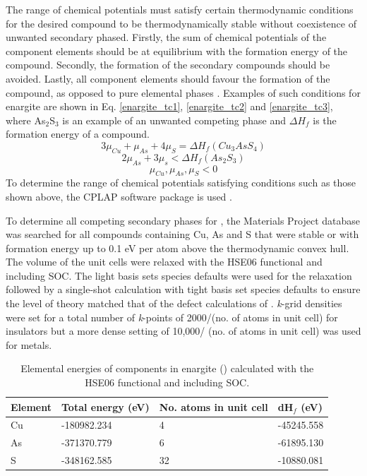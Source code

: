 \documentclass[11pt, twoside]{report}
\begin{document}
The range of chemical potentials must satisfy certain thermodynamic conditions for the desired compound to be thermodynamically stable without coexistence of unwanted secondary phased. Firstly, the sum of chemical potentials of the component elements should be at equilibrium with the formation energy of the compound. Secondly, the formation of the secondary compounds should be avoided. Lastly, all component elements should favour the formation of the compound, as opposed to pure elemental phases \cite{defects_Chen}. Examples of such conditions for enargite are shown in Eq. \ref{enargite_tc1}, \ref{enargite_tc2} and \ref{enargite_tc3}, where As$_2$S$_3$ is an example of an unwanted competing phase and $\Delta H_f$ is the formation energy of a compound.
\begin{equation}\label{enargite_tc1}
3\mu_{Cu} + \mu_{As} + 4\mu_{S} = \Delta H_f(Cu_3AsS_4)    
\end{equation}
\begin{equation}\label{enargite_tc2}
2\mu_{As} + 3\mu_{s} < \Delta H_f(As_2S_3)
\end{equation}
\begin{equation}\label{enargite_tc3}
\mu_{Cu}, \mu_{As}, \mu_{S} < 0    
\end{equation}
To determine the range of chemical potentials satisfying conditions such as those shown above, the CPLAP software package is used \cite{cplap}. 

To determine all competing secondary phases for {\enargite}, the Materials Project \cite{materials_project} database was searched for all compounds containing Cu, As and S that were stable or with formation energy up to 0.1 eV per atom above the thermodynamic convex hull. The volume of the unit cells were relaxed with the HSE06 functional and including SOC. The light basis sets species defaults were used for the relaxation followed by a single-shot calculation with tight basis set species defaults to ensure the level of theory matched that of the defect calculations of {\enargite}. \textit{k}-grid densities were set for a total number of \textit{k}-points of 2000/(no. of atoms in unit cell) for insulators but a more dense setting of 10,000/ (no. of atoms in unit cell) was used for metals.

\begin{table}[h!]
\begin{tabular}{@{}llll@{}}
\toprule
Element & Total energy (eV) & No. atoms in unit cell & dH$_f$ (eV)      \\ \midrule
Cu      & -180982.234      & 4                      & -45245.558 \\
As      & -371370.779      & 6                      & -61895.130 \\
S       & -348162.585       & 32                     & -10880.081 \\ \bottomrule
\end{tabular}
\caption{Elemental energies of components in enargite ({\enargite}) calculated with the HSE06 functional and including SOC.}\label{enargite_elements}
\end{table}
\end{document}
